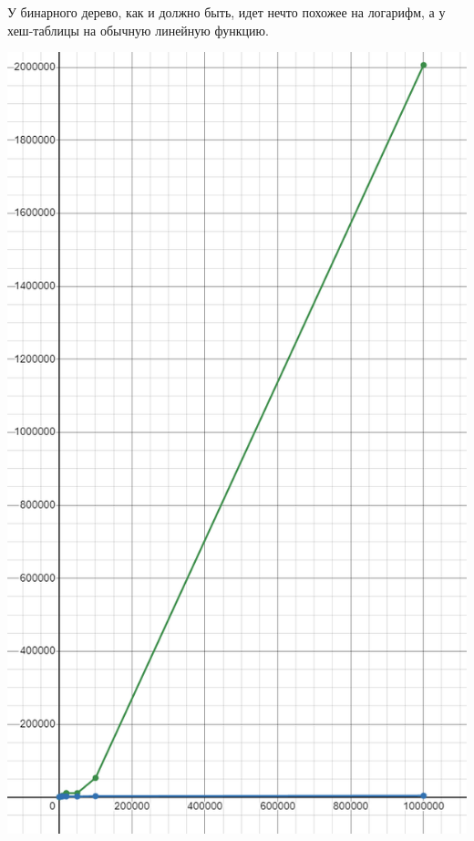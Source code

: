 \documentclass[12pt]{article}
\begin{document}
	У бинарного дерево, как и должно быть, идет нечто похожее на логарифм, а у хеш-таблицы на обычную линейную функцию.
	
	

	\includegraphics[width=\linewidth]{images/graphics}
	
\end{document}
